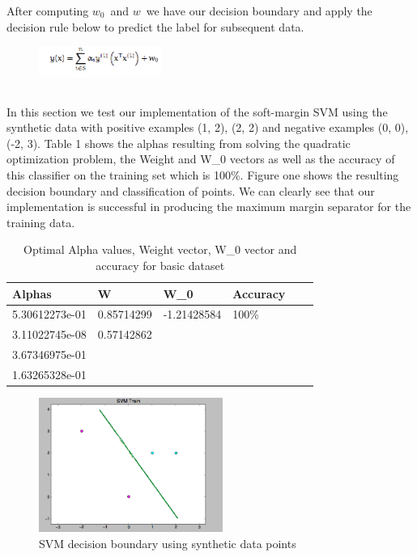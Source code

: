 \documentclass[pageno]{jpaper}
\begin{document}
After computing $w_0$\ and $w$\ we have our decision boundary and apply the decision rule below to predict the label for subsequent data.

\begin{figure}[ht!]
\centering
\includegraphics[width=40mm]{decision_rule}
\end{figure}

\subsection{}
In this section we test our implementation of the soft-margin SVM using the synthetic data with positive examples (1, 2), (2, 2) and negative examples (0, 0), (-2, 3). Table 1 shows the alphas resulting from solving the quadratic optimization problem, the Weight and W\_0 vectors as well as the accuracy of this classifier on the training set which is 100\%. Figure one shows the resulting decision boundary and classification of points. We can clearly see that our implementation is successful in producing the maximum margin separator for the training data.
\begin{table}[h!]
  \centering
  \begin{tabular}{llllll|}
    \hline
    \textbf{Alphas}  & \textbf{W}  & \textbf{W\_0} & \textbf{Accuracy}\\
    \hline
    \hline
 5.30612273e-01 	&0.85714299 &-1.21428584   &100\% \\
 \hline
3.11022745e-08	&0.57142862 	& & \\
 \hline
3.67346975e-01	& 	& & \\
 \hline
1.63265328e-01	& 	& & \\
 \hline
  \end{tabular}
  \caption{Optimal Alpha values, Weight vector, W\_0 vector and accuracy for basic dataset}
  \label{table:formatting}
\end{table}

\begin{figure}[ht!]
\centering
\includegraphics[width=60mm]{1_1_basic_synthetic}
\caption{SVM decision boundary using synthetic data points}
\label{overflow}
\end{figure}
\end{document}
